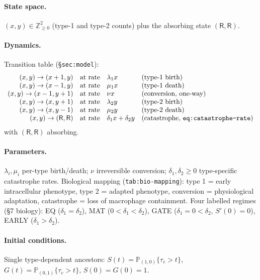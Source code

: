 \documentclass[11pt,a4paper]{article}
\newcommand{\PR}{\mathbb{P}}
\newcommand{\Rst}{\mathsf{R}}       %
\begin{document}
\paragraph{State space.} $(x,y)\in\mathbb Z_{\ge0}^2$ (type-1 and type-2
counts) plus the absorbing state $(\Rst,\Rst)$.

\paragraph{Dynamics.} Transition table (\S\texttt{sec:model}):
\[
\begin{array}{rcll}
(x,y)\to(x+1,y) & \text{at rate} & \lambda_1x & \text{(type-1 birth)}\\
(x,y)\to(x-1,y) & \text{at rate} & \mu_1x & \text{(type-1 death)}\\
(x,y)\to(x-1,y+1) & \text{at rate} & \nu x & \text{(conversion, one-way)}\\
(x,y)\to(x,y+1) & \text{at rate} & \lambda_2y & \text{(type-2 birth)}\\
(x,y)\to(x,y-1) & \text{at rate} & \mu_2y & \text{(type-2 death)}\\
(x,y)\to(\Rst,\Rst) & \text{at rate} & \delta_1x+\delta_2y
& \text{(catastrophe, \texttt{eq:catastrophe-rate})}
\end{array}
\]
with $(\Rst,\Rst)$ absorbing.

\paragraph{Parameters.} $\lambda_i,\mu_i$ per-type birth/death; $\nu$
irreversible conversion; $\delta_1,\delta_2\ge0$ type-specific catastrophe
rates. Biological mapping (\texttt{tab:bio-mapping}): type 1 = early
intracellular phenotype, type 2 = adapted phenotype, conversion =
physiological adaptation, catastrophe = loss of macrophage containment.
Four labelled regimes (\S7 biology): EQ ($\delta_1=\delta_2$), MAT
($0<\delta_1<\delta_2$), GATE ($\delta_1=0<\delta_2$, $S'(0)=0$), EARLY
($\delta_1>\delta_2$).

\paragraph{Initial conditions.} Single type-dependent ancestors:
$S(t)=\PR_{(1,0)}\{\tau_c>t\}$, $G(t)=\PR_{(0,1)}\{\tau_c>t\}$,
$S(0)=G(0)=1$.
\end{document}
